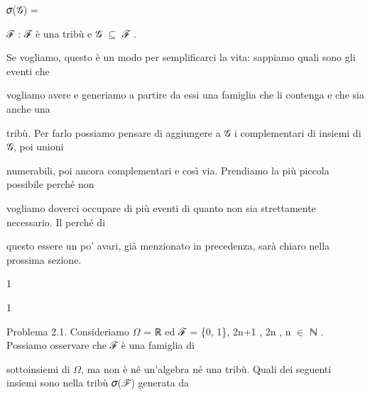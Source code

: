 \documentclass[a4paper,portrait,12pt]{article}
\begin{document}
\begin{flushleft}
𝜎(𝒢) =
\end{flushleft}





\begin{flushleft}
ℱ : ℱ \`{e} una tribù e 𝒢 $\subseteq$ ℱ .
\end{flushleft}





\begin{flushleft}
Se vogliamo, questo \`{e} un modo per semplificarci la vita: sappiamo quali sono gli eventi che
\end{flushleft}


\begin{flushleft}
vogliamo avere e generiamo a partire da essi una famiglia che li contenga e che sia anche una
\end{flushleft}


\begin{flushleft}
tribù. Per farlo possiamo pensare di aggiungere a 𝒢 i complementari di insiemi di 𝒢, poi unioni
\end{flushleft}


\begin{flushleft}
numerabili, poi ancora complementari e così via. Prendiamo la più piccola possibile perch\'{e} non
\end{flushleft}


\begin{flushleft}
vogliamo doverci occupare di più eventi di quanto non sia strettamente necessario. Il perch\'{e} di
\end{flushleft}


\begin{flushleft}
questo essere un po' avari, gi\`{a} menzionato in precedenza, sar\`{a} chiaro nella prossima sezione.
\end{flushleft}


1





1





\begin{flushleft}
Problema 2.1. Consideriamo $\Omega$ = ℝ ed ℱ = \{0, 1\}, 2n+1 , 2n , n $\in$ ℕ . Possiamo osservare che ℱ \`{e} una famiglia di
\end{flushleft}


\begin{flushleft}
sottoinsiemi di $\Omega$, ma non \`{e} n\'{e} un'algebra n\'{e} una tribù. Quali dei seguenti insiemi sono nella tribù 𝜎(ℱ) generata da
\end{flushleft}
\end{document}

